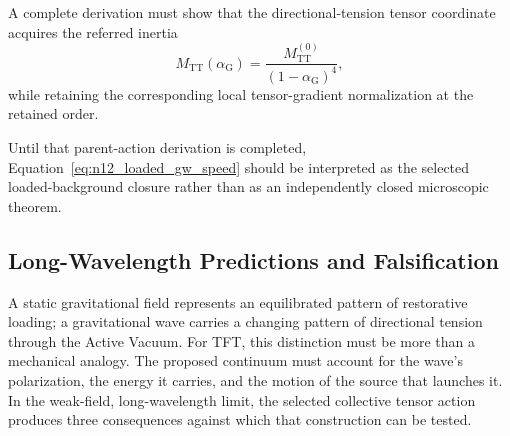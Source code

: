 A complete derivation must show that the directional-tension tensor coordinate acquires the referred inertia
\begin{equation}
    M_{\mathrm{TT}}(\alpha_{\mathrm{G}}) = \frac{ M_{\mathrm{TT}}^{(0)} }{ \left( 1-\alpha_{\mathrm{G}} \right)^{4} },
\end{equation}
while retaining the corresponding local tensor-gradient normalization at the retained order.

Until that parent-action derivation is completed, Equation~\eqref{eq:n12_loaded_gw_speed} should be interpreted as the selected loaded-background closure rather than as an independently closed microscopic theorem.

\subsection{Long-Wavelength Predictions and Falsification}
\label{subsec:n12_falsifiable_consequences}

A static gravitational field represents an equilibrated pattern of restorative
loading; a gravitational wave carries a changing pattern of directional tension
through the Active Vacuum. For TFT, this distinction must be more than a
mechanical analogy. The proposed continuum must account for the wave's
polarization, the energy it carries, and the motion of the source that launches
it. In the weak-field, long-wavelength limit, the selected collective tensor
action produces three consequences against which that construction can be
tested.

